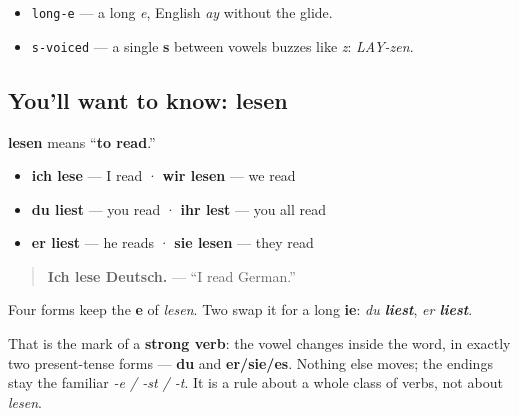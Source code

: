 \begin{sounds}
\begin{itemize}
\raggedright
  \item \texttt{long-e} — a long \emph{e}, English \emph{ay} without the glide.
  \item \texttt{s-voiced} — a single \textbf{s} between vowels buzzes like \emph{z}: \emph{LAY-zen}.
\end{itemize}
\end{sounds}

\subsection*{You'll want to know: lesen}
\textbf{lesen} means \textquotedblleft{}\textbf{to read}.\textquotedblright{}

\begin{itemize}
\raggedright
  \item \textbf{ich lese} — I read · \textbf{wir lesen} — we read
  \item \textbf{du liest} — you read · \textbf{ihr lest} — you all read
  \item \textbf{er liest} — he reads · \textbf{sie lesen} — they read
\end{itemize}

\begin{quote}
\textbf{Ich lese Deutsch.} — \textquotedblleft{}I read German.\textquotedblright{}
\end{quote}

\begin{grammarlens}[title={Grammar Lens: the vowel that breaks in the middle}]
Four forms keep the \textbf{e} of \emph{lesen}. Two swap it for a long \textbf{ie}: \emph{du \textbf{liest}}, \emph{er \textbf{liest}}.

That is the mark of a \textbf{strong verb}: the vowel changes inside the word, in exactly two present-tense forms — \textbf{du} and \textbf{er/sie/es}. Nothing else moves; the endings stay the familiar \emph{-e / -st / -t}. It is a rule about a whole class of verbs, not about \emph{lesen}.
\end{grammarlens}

